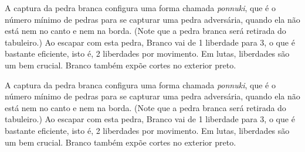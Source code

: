 \documentclass{book}
\begin{document}
  \problemDiagrams
  \answerDiagrams%
    {A captura da pedra branca configura uma forma chamada \emph{ponnuki}, que é o número mínimo de pedras para se capturar uma pedra adversária, quando ela não está nem no canto e nem na borda. (Note que a pedra branca será retirada do tabuleiro.)}%
    {Ao escapar com esta pedra, Branco vai de 1 liberdade para 3, o que é bastante eficiente, isto é, 2 liberdades por movimento. Em lutas, liberdades são um bem crucial. Branco também expõe cortes no exterior preto.}%

  \problemDiagrams
  \answerDiagrams%
    {A captura da pedra branca configura uma forma chamada \emph{ponnuki}, que é o número mínimo de pedras para se capturar uma pedra adversária, quando ela não está nem no canto e nem na borda. (Note que a pedra branca será retirada do tabuleiro.)}%
    {Ao escapar com esta pedra, Branco vai de 1 liberdade para 3, o que é bastante eficiente, isto é, 2 liberdades por movimento. Em lutas, liberdades são um bem crucial. Branco também expõe cortes no exterior preto.}%
\end{document}
